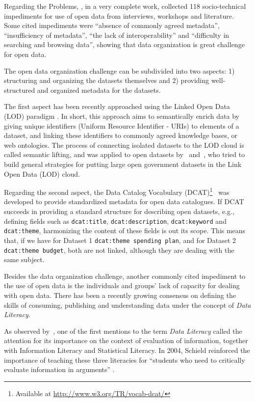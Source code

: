 {Regarding the Problems, , in a very complete work, collected 118 socio-technical impediments for use of open data from interviews, workshops and literature.
Some cited impediments were ``absence of commonly agreed metadata'', ``insufficiency of metadata'', ``the lack of interoperability'' and ``difficulty in searching and browsing data'', showing that data organization is great challenge for open data.

The open data organization challenge can be subdivided into two aspects: 1) structuring and organizing the datasets themselves and 2) providing well-structured and organized metadata for the datasets.

The first aspect has been recently approached using the Linked Open Data (LOD) paradigm \cite{Berners-Lee2006}.
In short, this approach aims to semantically enrich data by giving unique identifiers (Uniform Resource Identifier - URIs) to elements of a dataset, and linking these identifiers to commonly agreed knowledge bases, or web ontologies.
The process of connecting isolated datasets to the LOD cloud is called semantic lifting, and was applied to open datasets by~ and~, who tried to build general strategies for putting large open government datasets in the Link Open Data (LOD) cloud.

Regarding the second aspect, the Data Catalog Vocabulary (DCAT)\footnote{Available at \url{http://www.w3.org/TR/vocab-dcat/}}~\cite{conf/i-semantics/CyganiakMP10} was developed to provide standardized metadata for open data catalogues.
If DCAT succeeds in providing a standard structure for describing open datasets, e.g., defining fields such as \texttt{dcat:title}, \texttt{dcat:description}, \texttt{dcat:keyword} and \texttt{dcat:theme}, harmonizing the content of these fields is out its scope.
This means that, if we have for Dataset 1 \texttt{dcat:theme spending plan}, and for Dataset 2 \texttt{dcat:theme budget}, both are not linked, although they are dealing with the same subject.


Besides the data organization challenge, another commonly cited impediment to the use of open data is the individuals and groups' lack of capacity for dealing with open data.
There has been a recently growing consensus on defining the skills of consuming, publishing and understanding data under the concept of \emph{Data Literacy}.

As observed by~, one of the first mentions to the term \emph{Data Literacy} called the attention for its importance on the context of evaluation of information, together with  Information Literacy and Statistical Literacy. 
In 2004, Schield reinforced the importance of teaching these three literacies for ``students who need to critically evaluate information in arguments'' \cite[p.1]{Schield2004}.

}
